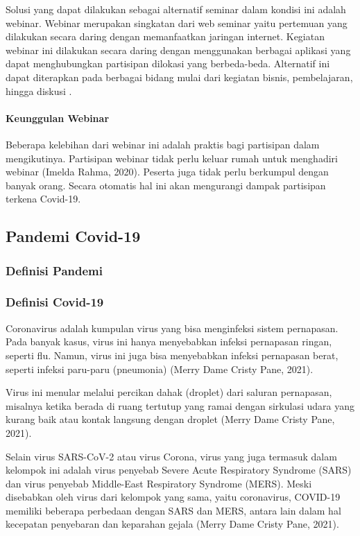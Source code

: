 Solusi yang dapat dilakukan sebagai alternatif seminar dalam kondisi ini adalah webinar. Webinar merupakan singkatan dari web seminar yaitu pertemuan yang dilakukan secara daring dengan memanfaatkan jaringan internet. Kegiatan webinar ini dilakukan secara daring dengan menggunakan berbagai aplikasi yang dapat menghubungkan partisipan dilokasi yang berbeda-beda. Alternatif ini dapat diterapkan pada berbagai bidang mulai dari kegiatan bisnis, pembelajaran, hingga diskusi \citep{fachrunnisa}.

\paragraph{Keunggulan Webinar}
Beberapa kelebihan dari webinar ini adalah praktis bagi partisipan dalam mengikutinya. Partisipan webinar tidak perlu keluar rumah untuk menghadiri webinar (Imelda Rahma, 2020). Peserta juga tidak perlu berkumpul dengan banyak orang. Secara otomatis hal ini akan mengurangi dampak partisipan terkena Covid-19.

\subsection{Pandemi Covid-19}
\subsubsection{Definisi Pandemi}
\subsubsection{Definisi Covid-19}
Coronavirus adalah kumpulan virus yang bisa menginfeksi sistem pernapasan. Pada banyak kasus, virus ini hanya menyebabkan infeksi pernapasan ringan, seperti flu. Namun, virus ini juga bisa menyebabkan infeksi pernapasan berat, seperti infeksi paru-paru (pneumonia) (Merry Dame Cristy Pane, 2021).

Virus ini menular melalui percikan dahak (droplet) dari saluran pernapasan, misalnya ketika berada di ruang tertutup yang ramai dengan sirkulasi udara yang kurang baik atau kontak langsung dengan droplet (Merry Dame Cristy Pane, 2021).

Selain virus SARS-CoV-2 atau virus Corona, virus yang juga termasuk dalam kelompok ini adalah virus penyebab Severe Acute Respiratory Syndrome (SARS) dan virus penyebab Middle-East Respiratory Syndrome (MERS). Meski disebabkan oleh virus dari kelompok yang sama, yaitu coronavirus, COVID-19 memiliki beberapa perbedaan dengan SARS dan MERS, antara lain dalam hal kecepatan penyebaran dan keparahan gejala (Merry Dame Cristy Pane, 2021).

